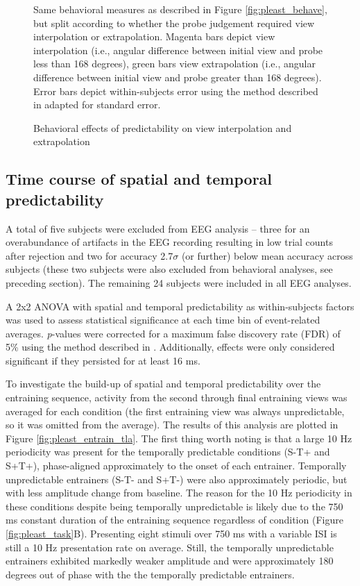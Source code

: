 \documentclass[dwyatte_dissertation.tex]{subfiles}
\begin{document}
\begin{figure}[h!]
\begin{center}
\begin{tabular}{ll}
\end{tabular}
\end{center}
\caption{Behavioral effects of predictability on view interpolation and extrapolation}{Same behavioral measures as described in Figure \ref{fig:pleast_behave}, but split according to whether the probe judgement required view interpolation or extrapolation. Magenta bars depict view interpolation (i.e., angular difference between initial view and probe less than 168 degrees), green bars view extrapolation (i.e., angular difference between initial view and probe greater than 168 degrees). Error bars depict within-subjects error using the method described in \protect{} adapted for standard error.}
\label{fig:pleast_behave_angle}
\end{figure}

\subsection{Time course of spatial and temporal predictability}
A total of five subjects were excluded from EEG analysis -- three for an overabundance of artifacts in the EEG recording resulting in low trial counts after rejection and two for accuracy 2.7$\sigma$ (or further) below mean accuracy across subjects (these two subjects were also excluded from behavioral analyses, see preceding section). The remaining 24 subjects were included in all EEG analyses. 

A 2x2 ANOVA with spatial and temporal predictability as within-subjects factors was used to assess statistical significance at each time bin of event-related averages. \textit{p}-values were corrected for a maximum false discovery rate (FDR) of 5\% using the method described in . Additionally, effects were only considered significant if they persisted for at least 16 ms.

To investigate the build-up of spatial and temporal predictability over the entraining sequence, activity from the second through final entraining views was averaged for each condition (the first entraining view was always unpredictable, so it was omitted from the average). The results of this analysis are plotted in Figure \ref{fig:pleast_entrain_tla}. The first thing worth noting is that a large 10 Hz periodicity was present for the temporally predictable conditions (S-T+ and S+T+), phase-aligned approximately to the onset of each entrainer. Temporally unpredictable entrainers (S-T- and S+T-) were also approximately periodic, but with less amplitude change from baseline. The reason for the 10 Hz periodicity in these conditions despite being temporally unpredictable is likely due to the 750 ms constant duration of the entraining sequence regardless of condition (Figure \ref{fig:pleast_task}B). Presenting eight stimuli over 750 ms with a variable ISI is still a 10 Hz presentation rate on average. Still, the temporally unpredictable entrainers exhibited markedly weaker amplitude and were approximately 180 degrees out of phase with the the temporally predictable entrainers.
\end{document}
